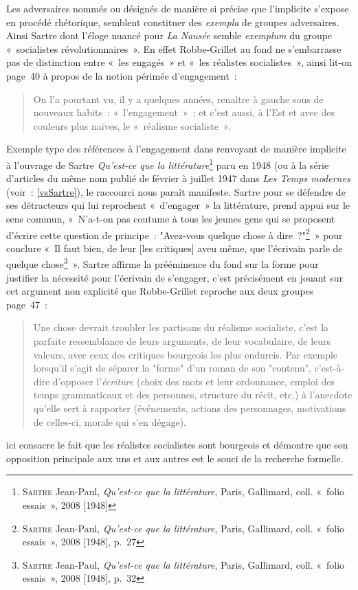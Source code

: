 Les adversaires nommés ou désignés de manière si précise que l'implicite s'expose en procédé rhétorique, semblent constituer des \textit{exempla} de groupes adversaires. Ainsi Sartre dont l'éloge nuancé pour \textit{La Nausée} semble \textit{exemplum} du groupe «~socialistes révolutionnaires~». En effet Robbe-Grillet au fond ne s'embarrasse pas de distinction entre «~les engagés~» et «~les réalistes socialistes~», ainsi lit-on page~40 à propos de la notion périmée d'engagement~:
\begin{quote}
    On l’a pourtant vu, il y a quelques années, renaître à gauche sous de nouveaux habits~: «~l’engagement~»~; et c’est aussi, à l’Est et avec des couleurs plus naïves, le «~réalisme socialiste~».
\end{quote}
Exemple type des références à l'engagement dans \punr{} renvoyant de manière implicite à l'ouvrage de Sartre \textit{Qu'est-ce que la littérature}\footnote{\textsc{Sartre} Jean-Paul, \textit{Qu'est-ce que la littérature}, Paris, Gallimard, coll. «~folio essais~», 2008 [1948]} paru en 1948 (ou à la série d'articles du même nom publié de février à juillet 1947 dans \textit{Les Temps modernes} (voir~: \ref{vsSartre}), le raccourci nous paraît manifeste. Sartre pour se défendre de ses détracteurs qui lui reprochent «~d'engager~» la littérature, prend appui sur le sens commun, «~N'a-t-on pas coutume à tous les jeunes gens qui se proposent d'écrire cette question de principe~: "Avez-vous quelque chose à dire~?"\footnote{\textsc{Sartre} Jean-Paul, \textit{Qu'est-ce que la littérature}, Paris, Gallimard, coll. «~folio essais~», 2008 [1948], p.~27}~» pour conclure «~Il faut bien, de leur [les critiques] aveu même, que l'écrivain parle de quelque chose\footnote{\textsc{Sartre} Jean-Paul, \textit{Qu'est-ce que la littérature}, Paris, Gallimard, coll. «~folio essais~», 2008 [1948], p.~32}~». Sartre affirme la prééminence du fond sur la forme pour justifier la nécessité pour l'écrivain de s'engager, c'est précisément en jouant sur cet argument non explicité que Robbe-Grillet reproche aux deux groupes page~47~:
\begin{quote}
    Une chose devrait troubler les partisans du réalisme socialiste, c'est la parfaite ressemblance de leurs arguments, de leur vocabulaire, de leurs valeurs, avec ceux des critiques bourgeois les plus endurcis. Par exemple lorsqu'il s'agit de séparer la "forme" d'un roman de son "contenu", c'est-à-dire d'opposer l'\textit{écriture} (choix des mots et leur ordonnance, emploi des temps grammaticaux et des personnes, structure du récit, etc.) à l'anecdote qu'elle sert à rapporter (événements, actions des personnages, motivations de celles-ci, morale qui s'en dégage).
\end{quote}
\robbe{} ici consacre le fait que les réalistes socialistes sont bourgeois et démontre que son opposition principale aux uns et aux autres est le souci de la recherche formelle.





